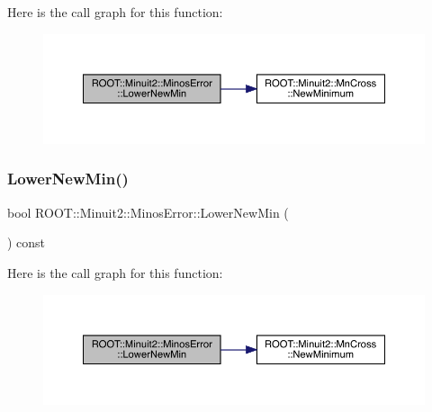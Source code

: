 Here is the call graph for this function\+:
\nopagebreak
\begin{figure}[H]
\begin{center}
\leavevmode
\includegraphics[width=350pt]{d2/dd1/classROOT_1_1Minuit2_1_1MinosError_a9a806056992d1acb26420bf4895b46e9_cgraph}
\end{center}
\end{figure}
\mbox{\label{classROOT_1_1Minuit2_1_1MinosError_a9a806056992d1acb26420bf4895b46e9}} 
\subsubsection{\texorpdfstring{LowerNewMin()}{LowerNewMin()}\hspace{0.1cm}{\footnotesize\ttfamily [2/3]}}
{\footnotesize\ttfamily bool R\+O\+O\+T\+::\+Minuit2\+::\+Minos\+Error\+::\+Lower\+New\+Min (\begin{DoxyParamCaption}{ }\end{DoxyParamCaption}) const\hspace{0.3cm}{\ttfamily [inline]}}

Here is the call graph for this function\+:
\nopagebreak
\begin{figure}[H]
\begin{center}
\leavevmode
\includegraphics[width=350pt]{d2/dd1/classROOT_1_1Minuit2_1_1MinosError_a9a806056992d1acb26420bf4895b46e9_cgraph}
\end{center}
\end{figure}
\mbox{\label{classROOT_1_1Minuit2_1_1MinosError_a9a806056992d1acb26420bf4895b46e9}} 
